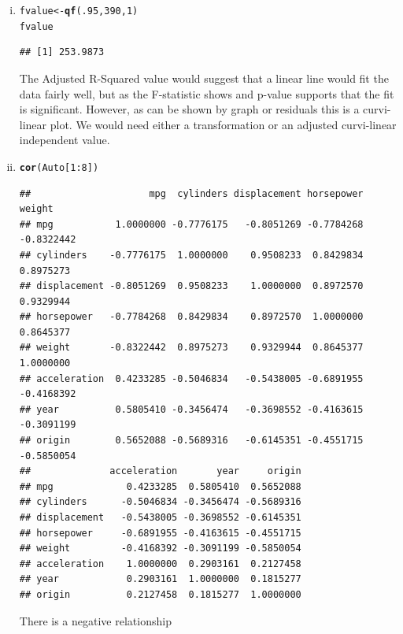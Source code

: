 \documentclass{article}\usepackage[]{graphicx}\usepackage[]{color}
\makeatletter
\newcommand{\hlnum}[1]{\textcolor[rgb]{0.686,0.059,0.569}{#1}}%
\newcommand{\hlopt}[1]{\textcolor[rgb]{0,0,0}{#1}}%
\newcommand{\hlstd}[1]{\textcolor[rgb]{0.345,0.345,0.345}{#1}}%
\newcommand{\hlkwb}[1]{\textcolor[rgb]{0.69,0.353,0.396}{#1}}%
\newcommand{\hlkwd}[1]{\textcolor[rgb]{0.737,0.353,0.396}{\textbf{#1}}}%
\newenvironment{kframe}{%
 \def\at@end@of@kframe{}%
 \ifinner\ifhmode%
  \def\at@end@of@kframe{\end{minipage}}%
  \begin{minipage}{\columnwidth}%
 \fi\fi%
 \def\FrameCommand##1{\hskip\@totalleftmargin \hskip-\fboxsep
 \colorbox{shadecolor}{##1}\hskip-\fboxsep
     \hskip-\linewidth \hskip-\@totalleftmargin \hskip\columnwidth}%
 \MakeFramed {\advance\hsize-\width
   \@totalleftmargin\z@ \linewidth\hsize
   \@setminipage}}%
 {\par\unskip\endMakeFramed%
 \at@end@of@kframe}
\newenvironment{knitrout}{}{} %
\makeatother
\begin{document}
\begin{enumerate}[(a)]
\begin{enumerate}[(i)]
\item
\begin{knitrout}
\color{fgcolor}\begin{kframe}
\begin{alltt}
\hlstd{fvalue}\hlkwb{<-}\hlkwd{qf}\hlstd{(}\hlnum{.95}\hlstd{,}\hlnum{390}\hlstd{,}\hlnum{1}\hlstd{)}
\hlstd{fvalue}
\end{alltt}
\begin{verbatim}
## [1] 253.9873
\end{verbatim}
\end{kframe}
\end{knitrout}
The Adjusted R-Squared value would suggest that a linear line would fit the data fairly well, but as the F-statistic shows and p-value supports that the fit is significant. However, as can be shown by graph or residuals this is a curvi-linear plot. We would need either a transformation or an adjusted curvi-linear independent value.

\item

\begin{knitrout}
\color{fgcolor}\begin{kframe}
\begin{alltt}
\hlkwd{cor}\hlstd{(Auto[}\hlnum{1}\hlopt{:}\hlnum{8}\hlstd{])}
\end{alltt}
\begin{verbatim}
##                     mpg  cylinders displacement horsepower     weight
## mpg           1.0000000 -0.7776175   -0.8051269 -0.7784268 -0.8322442
## cylinders    -0.7776175  1.0000000    0.9508233  0.8429834  0.8975273
## displacement -0.8051269  0.9508233    1.0000000  0.8972570  0.9329944
## horsepower   -0.7784268  0.8429834    0.8972570  1.0000000  0.8645377
## weight       -0.8322442  0.8975273    0.9329944  0.8645377  1.0000000
## acceleration  0.4233285 -0.5046834   -0.5438005 -0.6891955 -0.4168392
## year          0.5805410 -0.3456474   -0.3698552 -0.4163615 -0.3091199
## origin        0.5652088 -0.5689316   -0.6145351 -0.4551715 -0.5850054
##              acceleration       year     origin
## mpg             0.4233285  0.5805410  0.5652088
## cylinders      -0.5046834 -0.3456474 -0.5689316
## displacement   -0.5438005 -0.3698552 -0.6145351
## horsepower     -0.6891955 -0.4163615 -0.4551715
## weight         -0.4168392 -0.3091199 -0.5850054
## acceleration    1.0000000  0.2903161  0.2127458
## year            0.2903161  1.0000000  0.1815277
## origin          0.2127458  0.1815277  1.0000000
\end{verbatim}
\end{kframe}
\end{knitrout}
There is a negative relationship


\end{enumerate}
\end{enumerate}
\end{document}

